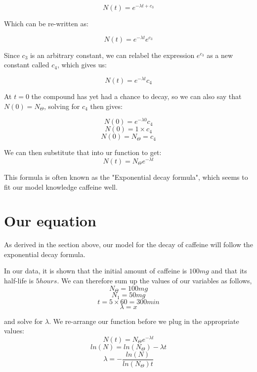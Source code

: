 \documentclass[12pt]{article}
\begin{document}
                        $$ N(t) = e^{-\lambda t + c_3} $$

                Which can be re-written as:

                        $$ N(t) = e^{-\lambda t}e^{c_3} $$

                Since $c_3$ is an arbitrary constant, we can relabel the expression $e^{c_3}$ as a new constant called $c_4$, which gives us:

                        $$ N(t) = e^{-\lambda t}{c_4} $$

                At $t=0$ the compound has yet had a chance to decay, so we can also say that $N(0) = N_\Theta$, solving for $c_4$ then gives:
                
                        $$ N(0) = e^{-\lambda 0}{c_4} $$
                        $$ N(0) = 1 \times {c_4} $$
                        $$N(0) = N_\Theta = c_4$$

                We can then substitute that into ur function to get:   
                        $$ N(t) = N_\Theta e^{-\lambda t} $$


                This formula is often known as the "Exponential decay formula", which seems to fit our model knowledge caffeine well.

                \section{Our equation}
                As derived in the section above, our model for the decay of caffeine will follow the exponential decay formula.

                In our data, it is shown that the initial amount of caffeine is $100mg$ and that its half-life is $5 hours$. We can therefore sum up the values of our variables as follows,
                         $$N_\Theta = 100mg$$
                         $$N_1 = 50mg$$ 
                        $$t = 5 \times 60 = 300min$$
                        $$ \lambda = x$$
                        
               \noindent 
               and solve for $\lambda$. We re-arrange our function before we plug in the appropriate values:
                        $$ N(t) = N_\Theta e^{-\lambda t}$$
                        $$ ln(N) = ln(N_\Theta) -\lambda t $$
                        $$ \lambda = -\frac{ln(N)}{ln(N_\Theta)t}$$
                
\end{document}
